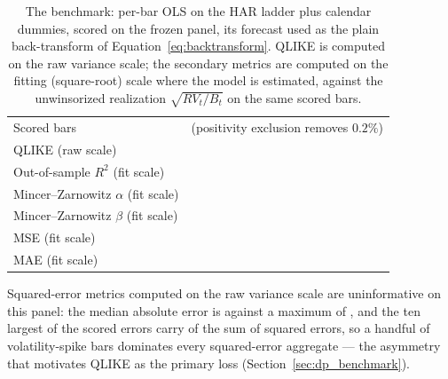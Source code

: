 \begin{table}[H]
\centering
\caption{The benchmark: per-bar OLS on the HAR ladder plus calendar
dummies, scored on the frozen panel, its forecast used as the plain
back-transform of Equation~\eqref{eq:backtransform}. QLIKE is
computed on the raw variance scale; the secondary metrics are computed on
the fitting (square-root) scale where the model is estimated, against
the unwinsorized realization $\sqrt{RV_t / B_t}$ on the same scored bars.
\label{tab:benchmark}}
\begin{tabular}{@{}lr@{}}
\toprule
Scored bars & \unifAzeroN{} (positivity exclusion removes $0.2\%$) \\
QLIKE (raw scale) & \unifAzeroQLIKE{} \\
Out-of-sample $R^2$ (fit scale) & \unifAzeroFitRsq{} \\
Mincer--Zarnowitz $\alpha$ (fit scale) & \unifAzeroFitMZalpha{} \\
Mincer--Zarnowitz $\beta$ (fit scale) & \unifAzeroFitMZbeta{} \\
MSE (fit scale) & \unifAzeroFitMSE{} \\
MAE (fit scale) & \unifAzeroFitMAE{} \\
\bottomrule
\end{tabular}
\end{table}
Squared-error metrics computed on the raw variance scale are uninformative
on this panel: the median absolute error is \unifAzeroMedAbsErr{} against a
maximum of \unifAzeroMaxAbsErr{}, and the ten largest of the
\unifAzeroNQlike{} scored errors carry \unifAzeroTopTenSSEPct{} of the sum
of squared errors, so a handful of volatility-spike bars dominates every
squared-error aggregate --- the asymmetry that motivates QLIKE as the
primary loss (Section~\ref{sec:dp_benchmark}).

